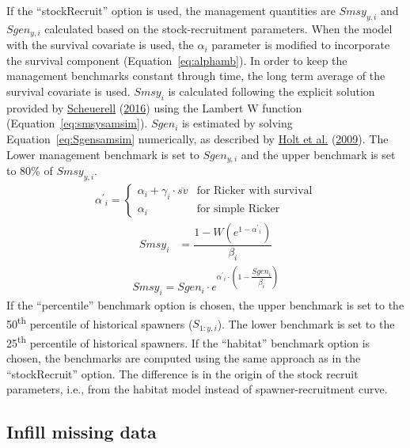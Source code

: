\documentclass[11pt]{book}
\begin{document}
If the ``stockRecruit'' option is used, the management quantities are \(Smsy_{y,i}\) and \(Sgen_{y,i}\) calculated based on the stock-recruitment parameters. When the model with the survival covariate is used, the \(\alpha_{i}\) parameter is modified to incorporate the survival component (Equation~\ref{eq:alphamb}). In order to keep the management benchmarks constant through time, the long term average of the survival covariate is used. \(Smsy_{i}\) is calculated following the explicit solution provided by \protect\hyperlink{ref-scheuerellExplicitSolutionCalculating2016}{Scheuerell} (\protect\hyperlink{ref-scheuerellExplicitSolutionCalculating2016}{2016}) using the Lambert W function (Equation~\ref{eq:smsysamsim}). \(Sgen_{i}\) is estimated by solving Equation~\ref{eq:Sgensamsim} numerically, as described by \protect\hyperlink{ref-holtIndicatorsStatusBenchmarks2009}{Holt et al.} (\protect\hyperlink{ref-holtIndicatorsStatusBenchmarks2009}{2009}). The Lower management benchmark is set to \(Sgen_{y,i}\) and the upper benchmark is set to 80\% of \(Smsy_{y,i}\).
\begin{align}
{\alpha^\prime}_{i} =
\begin{cases}
\alpha_{i} + \gamma_{i}\cdot \overline{sv} & \text{for Ricker with survival} \\
\alpha_{i}  & \text{for simple Ricker}
\end{cases}  
  \label{eq:alphamb}
\end{align}
\begin{align}
  Smsy_{i} &= \dfrac{1 - W(e^{1-{\alpha^\prime}_{i}})}{\beta_{i}}
  \label{eq:smsysamsim}
\end{align}
\begin{align}
  Smsy_{i} = Sgen_{i} \cdot e^{{\alpha^\prime}_{i}\cdot \left( 1-\dfrac{Sgen_{i}}{\beta_{i}}\right)}
  \label{eq:Sgensamsim}
\end{align}
If the ``percentile'' benchmark option is chosen, the upper benchmark is set to the 50\textsuperscript{th} percentile of historical spawners (\(S_{1:y,i}\)). The lower benchmark is set to the 25\textsuperscript{th} percentile of historical spawners. If the ``habitat'' benchmark option is chosen, the benchmarks are computed using the same approach as in the ``stockRecruit'' option. The difference is in the origin of the stock recruit parameters, i.e., from the habitat model instead of spawner-recruitment curve.

\hypertarget{infill-missing-data}{%
\subsection{Infill missing data}\label{infill-missing-data}}
\end{document}
